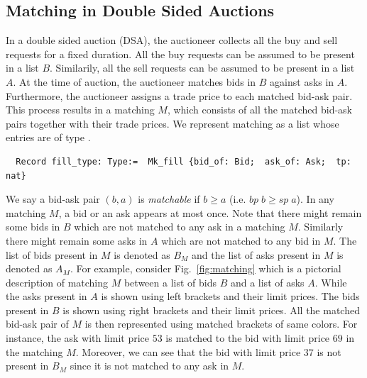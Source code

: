 \documentclass[a4paper,UKenglish,cleveref, autoref]{lipics-v2019}
\begin{document}
\subsection{Matching in Double Sided Auctions}
In a double sided auction (DSA), the auctioneer collects all the buy and sell requests for a fixed duration. All the buy requests can be assumed to be present in a list $B$. Similarily, all the sell requests can be assumed to be present in a list $A$. At the time of auction, the auctioneer matches bids in $B$ against asks in $A$. Furthermore, the auctioneer assigns a trade price to each matched bid-ask pair. This  process results in  a matching $M$, which consists of all the matched bid-ask pairs together with their trade prices. We represent matching as a list whose entries are of type .
\begin{verbatim}
  Record fill_type: Type:=  Mk_fill {bid_of: Bid;  ask_of: Ask;  tp: nat} 
\end{verbatim}

We say a bid-ask pair $(b, a)$ is \emph{matchable} if $b \ge a$ (i.e. $bp \; b \ge sp \; a$). In any matching $M$, a bid or an ask appears at most once. Note that there might remain some bids in $B$ which are not matched to any ask in a matching $M$. Similarly there might remain some asks in $A$ which are not matched to any bid in $M$. The list of bids present in $M$ is denoted as $B_{M}$ and the list of asks present in $M$ is denoted as $A_M$. For example, consider Fig.~\ref{fig:matching} which is a pictorial description of matching $M$ between a list of bids $B$ and a list of asks $A$. While the asks present in $A$ is shown using left brackets and their limit prices. The bids present in $B$ is shown using right brackets and their limit prices.  All the matched bid-ask pair of $M$ is then represented using matched brackets of same colors. For instance, the ask with limit price $53$ is matched to the bid with limit price $69$ in the matching $M$. Moreover, we can see that the bid with limit price $37$ is not present in $B_M$ since it is not matched to any ask in $M$.    
\end{document}
